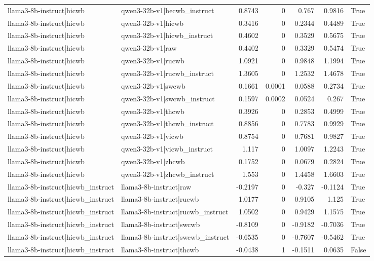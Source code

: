 \begin{table}
\begin{tabular}{l l r r r r l}
llama3-8b-instruct|hicwb & qwen3-32b-v1|hecwb_instruct & 0.8743 & 0 & 0.767 & 0.9816 & True \\
llama3-8b-instruct|hicwb & qwen3-32b-v1|hicwb & 0.3416 & 0 & 0.2344 & 0.4489 & True \\
llama3-8b-instruct|hicwb & qwen3-32b-v1|hicwb_instruct & 0.4602 & 0 & 0.3529 & 0.5675 & True \\
llama3-8b-instruct|hicwb & qwen3-32b-v1|raw & 0.4402 & 0 & 0.3329 & 0.5474 & True \\
llama3-8b-instruct|hicwb & qwen3-32b-v1|rucwb & 1.0921 & 0 & 0.9848 & 1.1994 & True \\
llama3-8b-instruct|hicwb & qwen3-32b-v1|rucwb_instruct & 1.3605 & 0 & 1.2532 & 1.4678 & True \\
llama3-8b-instruct|hicwb & qwen3-32b-v1|swcwb & 0.1661 & 0.0001 & 0.0588 & 0.2734 & True \\
llama3-8b-instruct|hicwb & qwen3-32b-v1|swcwb_instruct & 0.1597 & 0.0002 & 0.0524 & 0.267 & True \\
llama3-8b-instruct|hicwb & qwen3-32b-v1|thcwb & 0.3926 & 0 & 0.2853 & 0.4999 & True \\
llama3-8b-instruct|hicwb & qwen3-32b-v1|thcwb_instruct & 0.8856 & 0 & 0.7783 & 0.9929 & True \\
llama3-8b-instruct|hicwb & qwen3-32b-v1|vicwb & 0.8754 & 0 & 0.7681 & 0.9827 & True \\
llama3-8b-instruct|hicwb & qwen3-32b-v1|vicwb_instruct & 1.117 & 0 & 1.0097 & 1.2243 & True \\
llama3-8b-instruct|hicwb & qwen3-32b-v1|zhcwb & 0.1752 & 0 & 0.0679 & 0.2824 & True \\
llama3-8b-instruct|hicwb & qwen3-32b-v1|zhcwb_instruct & 1.553 & 0 & 1.4458 & 1.6603 & True \\
llama3-8b-instruct|hicwb_instruct & llama3-8b-instruct|raw & -0.2197 & 0 & -0.327 & -0.1124 & True \\
llama3-8b-instruct|hicwb_instruct & llama3-8b-instruct|rucwb & 1.0177 & 0 & 0.9105 & 1.125 & True \\
llama3-8b-instruct|hicwb_instruct & llama3-8b-instruct|rucwb_instruct & 1.0502 & 0 & 0.9429 & 1.1575 & True \\
llama3-8b-instruct|hicwb_instruct & llama3-8b-instruct|swcwb & -0.8109 & 0 & -0.9182 & -0.7036 & True \\
llama3-8b-instruct|hicwb_instruct & llama3-8b-instruct|swcwb_instruct & -0.6535 & 0 & -0.7607 & -0.5462 & True \\
llama3-8b-instruct|hicwb_instruct & llama3-8b-instruct|thcwb & -0.0438 & 1 & -0.1511 & 0.0635 & False \\

\end{tabular}
\end{table}
